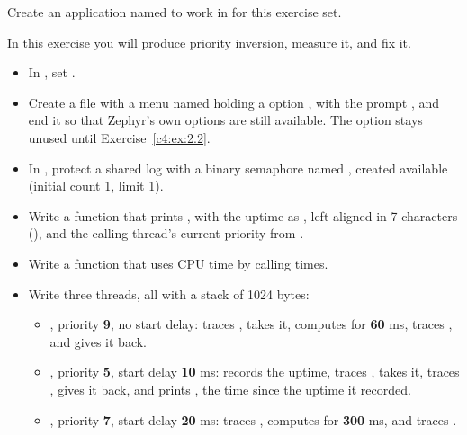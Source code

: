 \label{c4:set:2}
Create an application named  to work in for this exercise set.

\label{c4:ex:2.1}
In this exercise you will produce priority inversion, measure it, and fix it.

\begin{itemize}
  \item In , set .
  \item Create a  file with a menu named  holding a  option
    , with the prompt , and
    end it so that Zephyr’s own options are still available. The option stays unused until
    Exercise~\ref{c4:ex:2.2}.
  \item In , protect a shared log with a binary semaphore named , created
    available (initial count 1, limit 1).
  \item Write a function  that prints ,
    with the uptime as ,  left-aligned in 7 characters (), and the
    calling thread’s current priority from .
  \item Write a function  that uses CPU time by calling 
     times.
  \item Write three threads, all with a stack of 1024 bytes:
\begin{itemize}
  \item {}, priority \textbf{9}, no start delay: traces , takes it, computes
    for \textbf{60} ms, traces , and gives it back.
  \item {}, priority \textbf{5}, start delay \textbf{10} ms: records the uptime, traces
    , takes it, traces , gives it back, and prints , the time since the uptime it recorded.
  \item {}, priority \textbf{7}, start delay \textbf{20} ms: traces ,
    computes for \textbf{300} ms, and traces .
\end{itemize}
\end{itemize}

